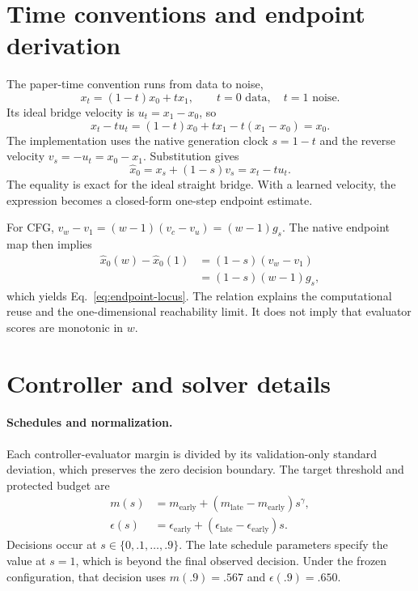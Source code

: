 \documentclass[10pt,twocolumn,letterpaper]{article}
\begin{document}
{
    \small
    
    
}

\ifincludesupplementary
\clearpage
\appendix

\section{Time conventions and endpoint derivation}
\label{app:derivation}

The paper-time convention runs from data to noise,
\begin{equation}
    x_t=(1-t)x_0+t x_1,\qquad t=0\text{ data},\quad t=1\text{ noise}.
    \label{eq:path-paper-appendix}
\end{equation}
Its ideal bridge velocity is $u_t=x_1-x_0$, so
\begin{equation}
    x_t-tu_t=(1-t)x_0+t x_1-t(x_1-x_0)=x_0.
    \label{eq:data-pred-paper}
\end{equation}
The implementation uses the native generation clock $s=1-t$ and the reverse
velocity $v_s=-u_t=x_0-x_1$. Substitution gives
\begin{equation}
    \hat{x}_0=x_s+(1-s)v_s=x_t-tu_t.
    \label{eq:data-pred-native}
\end{equation}
The equality is exact for the ideal straight bridge. With a learned velocity,
the expression becomes a closed-form one-step endpoint estimate.

For CFG, $v_w-v_1=(w-1)(v_c-v_u)=(w-1)g_s$. The native endpoint map then
implies
\begin{align}
\hat{x}_0(w)-\hat{x}_0(1)
&=(1-s)(v_w-v_1)\\
&=(1-s)(w-1)g_s,
\end{align}
which yields Eq.~\eqref{eq:endpoint-locus}. The relation explains the
computational reuse and the one-dimensional reachability limit. It does not
imply that evaluator scores are monotonic in $w$.

\section{Controller and solver details}
\label{app:controller-details}

\paragraph{Schedules and normalization.}
Each controller-evaluator margin is divided by its validation-only standard
deviation, which preserves the zero decision boundary. The target threshold
and protected budget are
\begin{align}
m(s)&=m_{\mathrm{early}}+
  (m_{\mathrm{late}}-m_{\mathrm{early}})s^\gamma,
  \label{eq:threshold}\\
\epsilon(s)&=\epsilon_{\mathrm{early}}+
  (\epsilon_{\mathrm{late}}-\epsilon_{\mathrm{early}})s.
  \label{eq:budget}
\end{align}
Decisions occur at $s\in\{0,.1,\ldots,.9\}$. The late schedule parameters specify
the value at $s=1$, which is beyond the final observed decision. Under the
frozen configuration, that decision uses $m(.9)=.567$ and
$\epsilon(.9)=.650$.
\end{document}
